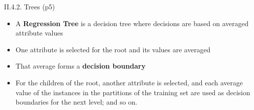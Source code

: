 \documentclass[handout]{beamer}
\newcommand{\strong}[1]{\textbf{\color{teal} #1}}
\begin{document}
\begin{frame}{II.4.2. Trees (p5)}
\begin{itemize}
\item A \strong{Regression Tree} is a decision tree where decisions are based on averaged attribute values
\item One attribute is selected for the root and its values are averaged
\item That average forms a \strong{decision boundary}
\item For the children of the root, another attribute is selected, and each average value of the instances in the partitions of the training set are used as decision boundaries for the next level; and so on.
\end{itemize}
\end{frame}
\end{document}
